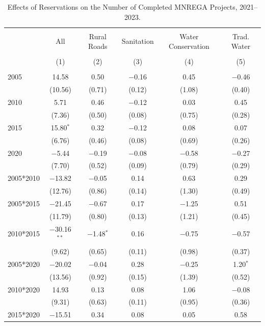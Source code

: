 \begin{table}[!htbp]
\centering
\begin{threeparttable}

  \caption{Effects of Reservations on the Number of Completed MNREGA Projects, 2021--2023.} 
  \label{main_mnrega_2011_2023_all} 
\scriptsize 
\begin{tabular}{@{\extracolsep{0pt}}lccccc} 
\\[-1.8ex]\hline 
\hline \\[-1.8ex] 
 & All & Rural Roads & Sanitation & Water Conservation & Trad. Water \\ 
\\[-1.8ex] & (1) & (2) & (3) & (4) & (5)\\ 
\hline \\[-1.8ex] 
 2005 & 14.58 & 0.50 & $-$0.16 & 0.45 & $-$0.46 \\ 
  & (10.56) & (0.71) & (0.12) & (1.08) & (0.40) \\ 
  2010 & 5.71 & 0.46 & $-$0.12 & 0.03 & 0.45 \\ 
  & (7.36) & (0.50) & (0.08) & (0.75) & (0.28) \\ 
  2015 & 15.80$^{*}$ & 0.32 & $-$0.12 & 0.08 & 0.07 \\ 
  & (6.76) & (0.46) & (0.08) & (0.69) & (0.26) \\ 
  2020 & $-$5.44 & $-$0.19 & $-$0.08 & $-$0.58 & $-$0.27 \\ 
  & (7.70) & (0.52) & (0.09) & (0.79) & (0.29) \\ 
  2005*2010 & $-$13.82 & $-$0.05 & 0.14 & 0.63 & 0.29 \\ 
  & (12.76) & (0.86) & (0.14) & (1.30) & (0.49) \\ 
  2005*2015 & $-$21.45 & $-$0.67 & 0.17 & $-$1.25 & 0.51 \\ 
  & (11.79) & (0.80) & (0.13) & (1.21) & (0.45) \\ 
  2010*2015 & $-$30.16$^{**}$ & $-$1.48$^{*}$ & 0.16 & $-$0.75 & $-$0.57 \\ 
  & (9.62) & (0.65) & (0.11) & (0.98) & (0.37) \\ 
  2005*2020 & $-$20.02 & $-$0.04 & 0.28 & $-$0.25 & 1.20$^{*}$ \\ 
  & (13.56) & (0.92) & (0.15) & (1.39) & (0.52) \\ 
  2010*2020 & 14.93 & 0.13 & 0.08 & 1.06 & $-$0.08 \\ 
  & (9.31) & (0.63) & (0.11) & (0.95) & (0.36) \\ 
  2015*2020 & $-$15.51 & 0.34 & 0.08 & 0.05 & 0.58 \\ 

\end{tabular}
\end{threeparttable}
\end{table}

